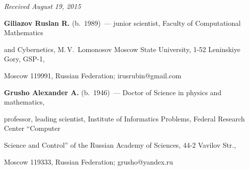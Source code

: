 \vspace*{-1pt}





\hfill{\small\textit{Received August 19, 2015}}  








\Contr





\noindent


\textbf{Giliazov Ruslan R.} (b.\ 1989)~--- junior scientist, Faculty of Computational Mathematics 


and Cybernetics, M.\,V.~Lomonosov Moscow State University, 1-52 Leninskiye Gory, GSP-1, 


Moscow 119991, Russian Federation; irusrubin@gmail.com





\vspace*{5pt}





\noindent


\textbf{Grusho Alexander A.} (b.\ 1946)~--- Doctor of Science in physics and mathematics, 


professor, leading scientist, Institute of Informatics Problems,  Federal Research Center ``Computer 


Science and Control'' of the Russian Academy of Sciences, 44-2 Vavilov Str.,


Moscow 119333, Russian Federation; grusho@yandex.ru








 \label{end\stat}








\renewcommand{\tablename}{\protect\bf Таблица}





\renewcommand{\bibname}{\protect\rm Литература}


